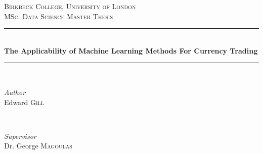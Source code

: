 \documentclass[11pt]{article}
\begin{document}
\begin{titlepage} %
	\newcommand{\HRule}{\rule{\linewidth}{0.5mm}} %
	
	\center %
	
	
	\textsc{\Large \textcolor{brickred}{Birkbeck College, University of London}}\\[1.5cm] %
	
	\textsc{\Large MSc. Data Science Master Thesis}\\[0.5cm] %
		
	
	\HRule\\[0.4cm]
	
	{\huge\bfseries The Applicability of Machine Learning Methods For Currency Trading}\\[0.4cm] %
	
	\HRule\\[1.5cm]
	
	
	\begin{minipage}{0.4\textwidth}
		\begin{flushleft}
			\large
			\textit{Author}\\
			\textcolor{brickred}{Edward \textsc{Gill}} %
		\end{flushleft}
	\end{minipage}
	~
	\begin{minipage}{0.4\textwidth}
		\begin{flushright}
			\large
			\textit{Supervisor}\\
			\textcolor{brickred}{Dr. George \textsc{Magoulas}} %
		\end{flushright}
	\end{minipage}
	
\vspace{25mm}


\end{titlepage}
\end{document}
